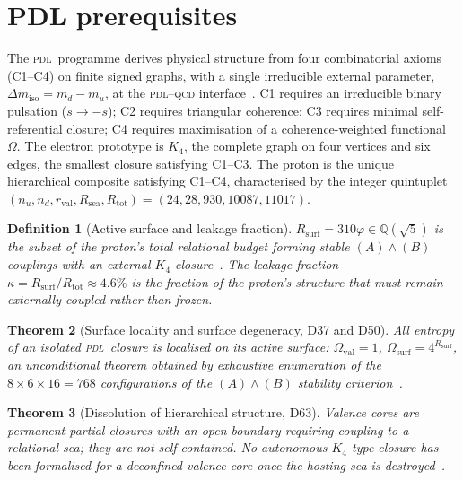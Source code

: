 \documentclass[12pt,a4paper]{article}
\newtheorem{theorem}{Theorem}[section]
\newtheorem{definition}[theorem]{Definition}
\newcommand{\Kfour}{K_4}
\newcommand{\PDL}{\textsc{pdl}}
\newcommand{\Rsurf}{R_{\mathrm{surf}}}
\newcommand{\Rtot}{R_{\mathrm{tot}}}
\newcommand{\rval}{r_{\mathrm{val}}}
\newcommand{\Rsea}{R_{\mathrm{sea}}}
\newcommand{\Omegasurf}{\Omega_{\mathrm{surf}}}
\newcommand{\vp}{\varphi}
\newcommand{\kap}{\kappa}
\newcommand{\Dmiso}{\Delta m_{\mathrm{iso}}}
\begin{document}
\section{PDL prerequisites}
\label{sec:prereq}

The \PDL\ programme derives physical structure from four
combinatorial axioms (C1--C4) on finite signed graphs, with a
single irreducible external parameter, $\Dmiso=m_d-m_u$, at the
\PDL--\textsc{qcd} interface~\citep{PDL_D01_2026}. C1 requires an
irreducible binary pulsation ($s\to-s$); C2 requires triangular
coherence; C3 requires minimal self-referential closure; C4
requires maximisation of a coherence-weighted functional $\Omega$.
The electron prototype is $\Kfour$, the complete graph on four
vertices and six edges, the smallest closure satisfying C1--C3. The
proton is the unique hierarchical composite satisfying C1--C4,
characterised by the integer quintuplet
$(n_u,n_d,\rval,\Rsea,\Rtot)=(24,28,930,10087,11017)$.

\begin{definition}[Active surface and leakage fraction]
$\Rsurf=310\vp\in\mathbb{Q}(\sqrt5)$ is the subset of the proton's
total relational budget forming stable $(A)\wedge(B)$ couplings
with an external $\Kfour$ closure~\citep{PDL_D29_2026}. The leakage
fraction $\kap=\Rsurf/\Rtot\approx4.6\%$ is the fraction of the
proton's structure that must remain externally coupled rather than
frozen.
\end{definition}

\begin{theorem}[Surface locality and surface degeneracy,
D37 and D50]
\label{thm:BH1D50}
All entropy of an isolated \PDL\ closure is localised on its active
surface: $\Omega_{\mathrm{val}}=1$, $\Omegasurf=4^{\Rsurf}$, an
unconditional theorem obtained by exhaustive enumeration of the
$8\times6\times16=768$ configurations of the $(A)\wedge(B)$
stability criterion~\citep{PDL_D29_2026,PDL_D37_2026,PDL_D50_2026}.
\end{theorem}

\begin{theorem}[Dissolution of hierarchical structure, D63]
\label{thm:D63}
Valence cores are permanent partial closures with an open boundary
requiring coupling to a relational sea; they are not
self-contained. No autonomous $\Kfour$-type closure has been
formalised for a deconfined valence core once the hosting sea is
destroyed~\citep{PDL_D63_2026}.
\end{theorem}
\end{document}
